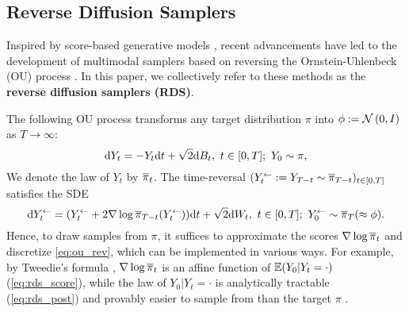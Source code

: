 \subsection{Reverse Diffusion Samplers}
Inspired by score-based generative models \citep{song2021scorebased}, recent advancements have led to the development of multimodal samplers based on reversing the Ornstein-Uhlenbeck (OU) process \citep{huang2024reverse,huang2024faster,he2024zeroth,vacher2025polynomial}. In this paper, we collectively refer to these methods as the \textbf{reverse diffusion samplers (RDS)}.

The following OU process transforms any target distribution $\pi$ into $\phi:=\operatorname{\mathcal{N}}\left(0,I\right)$ as $T\to\infty$:
\begin{equation}
    \mathrm{d} Y_t=-Y_t\mathrm{d} t+\sqrt{2}\mathrm{d} B_t,~t\in[0,T];~Y_0\sim\pi,
    \label{eq:ou}
\end{equation}
We denote the law of $Y_t$ by $\overline{\pi}_t$. The time-reversal $(Y^\gets_t:=Y_{T-t}\sim\overline{\pi}_{T-t})_{t\in[0,T]}$ satisfies the SDE
\begin{equation}
    \mathrm{d}Y^\gets_t=(Y^\gets_t+2\nabla\log\overline{\pi}_{T-t}(Y^\gets_t))\mathrm{d} t+\sqrt{2}\mathrm{d} W_t,~t\in[0,T];~Y^\gets_0\sim\overline{\pi}_T(\approx\phi).
    \label{eq:ou_rev}
\end{equation}
Hence, to draw samples from $\pi$, it suffices to approximate the scores $\nabla\log\overline{\pi}_t$ and discretize \cref{eq:ou_rev}, which can be implemented in various ways. For example, by Tweedie's formula \citep{robbins1992an}, $\nabla\log\overline{\pi}_t$ is an affine function of $\operatorname{\mathbb{E}}(Y_0|Y_t=\cdot)$ (\cref{eq:rds_score}), while the law of $Y_0|Y_t=\cdot$ is analytically tractable (\cref{eq:rds_post}) and provably easier to sample from than the target $\pi$ \citep{huang2024reverse}.